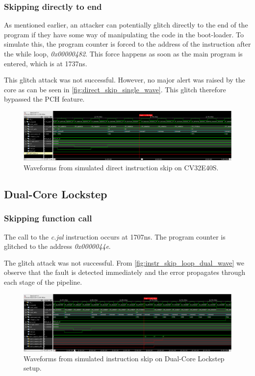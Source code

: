 \subsubsection{Skipping directly to end}

As mentioned earlier, an attacker can potentially glitch directly to the end of the program if they have some way of manipulating the code in the boot-loader. To simulate this, the program counter is forced to the address of the instruction after the while loop, \textit{0x00000482}. This force happens as soon as the main program is entered, which is at 1737ns.

This glitch attack was not successful. However, no major alert was raised by the core as can be seen in \autoref{fig:direct_skip_single_wave}. This glitch therefore bypassed the PCH feature. 

\begin{figure}[h!]
    \centering
    \includegraphics[width=\textwidth]{docs/images/direct_skip_single_core.png}
    \caption{Waveforms from simulated direct instruction skip on CV32E40S.}
    \label{fig:direct_skip_single_wave}
\end{figure}

\subsection{Dual-Core Lockstep}
\label{subsec:dual_instr_skip}

\subsubsection{Skipping function call}

The call to the \textit{c.jal} instruction occurs at 1707ns. The program counter is glitched to the address \textit{0x0000044e}. 

The glitch attack was not successful. From \autoref{fig:instr_skip_loop_dual_wave} we observe that the fault is detected immediately and the error propagates through each stage of the pipeline. 

\begin{figure}[h!]
    \centering
    \includegraphics[width=\textwidth]{docs/images/instr_skip_dual_core.png}
    \caption{Waveforms from simulated instruction skip on Dual-Core Lockstep setup.}
    \label{fig:instr_skip_dual_wave}
\end{figure}


